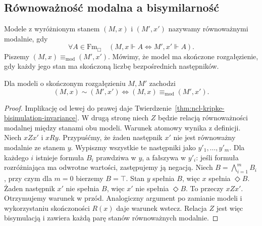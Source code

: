 \subsection{Równoważność modalna a bisymilarność}

\begin{definicja}
\label{def:ncl-kripke-modal-equivalence}
Modele z wyróżnionym stanem $(M,x)$ i $(M',x')$
nazywamy równoważnymi modalnie, gdy
\[
 \forall A\in\mathrm{Fm}_{\Box}\quad
 (M,x\Vdash A\iff M',x'\Vdash A).
\]
Piszemy $(M,x)\equiv_{\mathrm{mod}}(M',x')$.
Mówimy, że model ma skończone rozgałęzienie,
gdy każdy jego stan ma skończoną liczbę
bezpośrednich następników.
\end{definicja}

\begin{twierdzenie}
\label{thm:ncl-kripke-hennessy-milner}
Dla modeli o skończonym rozgałęzieniu
$M,M'$ zachodzi
\[
 (M,x)\sim(M',x')
 \iff (M,x)\equiv_{\mathrm{mod}}(M',x').
\]
\end{twierdzenie}
\begin{proof}
Implikację od lewej do prawej daje
Twierdzenie~\ref{thm:ncl-kripke-bisimulation-invariance}.
W drugą stronę niech $Z$ będzie relacją
równoważności modalnej między stanami
obu modeli. Warunek atomowy wynika z definicji.
Niech $xZx'$ i $xRy$. Przypuśćmy, że żaden
następnik $x'$ nie jest równoważny modalnie
ze stanem $y$. Wypiszmy wszystkie te następniki
jako $y'_1,\ldots,y'_m$.
Dla każdego $i$ istnieje formuła $B_i$ prawdziwa
w $y$, a fałszywa w $y'_i$: jeśli formuła
rozróżniająca ma odwrotne wartości,
zastępujemy ją negacją.
Niech $B=\bigwedge_{i=1}^{m}B_i$,
przy czym dla $m=0$ bierzemy $B=\top$.
Stan $y$ spełnia $B$, więc $x$ spełnia
$\Diamond B$. Żaden następnik $x'$ nie
spełnia $B$, więc $x'$ nie spełnia $\Diamond B$.
To przeczy $xZx'$. Otrzymujemy warunek w przód.
Analogiczny argument po zamianie modeli
i wykorzystaniu skończoności $R(x)$ daje
warunek wstecz. Relacja $Z$ jest więc
bisymulacją i zawiera każdą parę stanów
równoważnych modalnie.
\end{proof}

